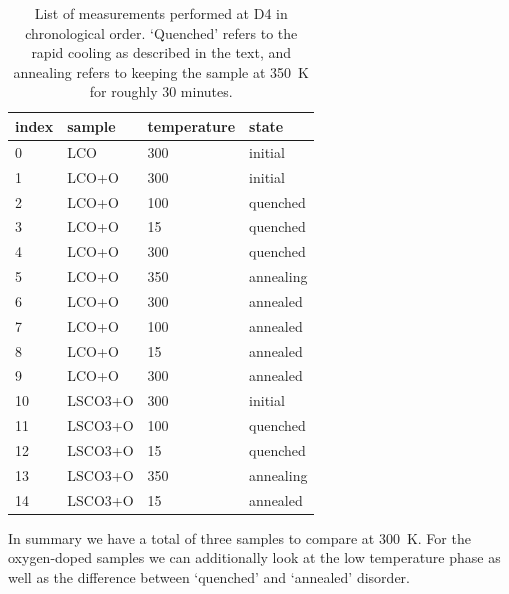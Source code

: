 \begin{table}
    \centering
    \begin{tabular}{llll}
        \toprule
        index &   sample & temperature &      state \\
        \midrule
        0  &      LCO &         300 &    initial \\
        1  &    LCO+O &         300 &    initial \\
        2  &    LCO+O &         100 &   quenched \\
        3  &    LCO+O &          15 &   quenched \\
        4  &    LCO+O &         300 &   quenched \\
        5  &    LCO+O &         350 &  annealing \\
        6  &    LCO+O &         300 &   annealed \\
        7  &    LCO+O &         100 &   annealed \\
        8  &    LCO+O &          15 &   annealed \\
        9  &    LCO+O &         300 &   annealed \\
        10 &  LSCO3+O &         300 &    initial \\
        11 &  LSCO3+O &         100 &   quenched \\
        12 &  LSCO3+O &          15 &   quenched \\
        13 &  LSCO3+O &         350 &  annealing \\
        14 &  LSCO3+O &          15 &   annealed \\
        \bottomrule
    \end{tabular}
    \caption{List of measurements performed at D4 in chronological order. `Quenched' refers to the rapid cooling as described in the text, and annealing refers to keeping the sample at \SI{350}{\kelvin} for roughly 30 minutes.}
    \label{tab:measurments}
\end{table}

In summary we have a total of three samples to compare at \SI{300}{\kelvin}. For the oxygen-doped samples we can additionally look at the low temperature phase as well as the difference between `quenched' and `annealed' disorder.

